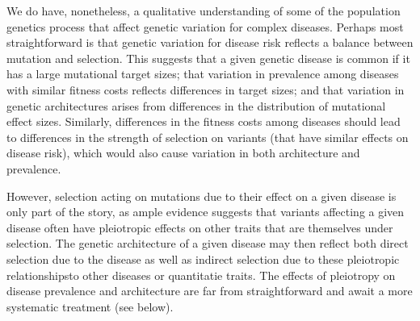 \documentclass[11pt]{article}
\begin{document}
We do have, nonetheless, a qualitative understanding of some of the population genetics process that affect genetic variation for complex diseases. Perhaps most straightforward is that genetic variation for disease risk reflects a balance between mutation and selection.\cite{Johnson:2005do} This suggests that a given genetic disease is common if it has a large mutational target sizes; that variation in prevalence among diseases with similar fitness costs reflects differences in target sizes; and that variation in genetic architectures arises from differences in the distribution of mutational effect sizes. Similarly, differences in the fitness costs among diseases should lead to differences in the strength of selection on variants (that have similar effects on disease risk), which would also cause variation in both architecture and prevalence. 

However, selection acting on mutations due to their effect on a given disease is only part of the story, as ample evidence suggests that variants affecting a given disease often have pleiotropic effects on other traits that are themselves under selection\cite{Pickrell:2016ko, Visscher:2016fp}. The genetic architecture of a given disease may then reflect both direct selection due to the disease as well as indirect selection due to these pleiotropic relationshipsto other diseases or quantitatie traits\cite{Fraser:2013jj,Berg:2014bs, Corona:2013cl, Chen:2012jv, Ayub:2014hk,Polimanti:2017bv}. The effects of pleiotropy on disease prevalence and architecture are far from straightforward and await a more systematic treatment (see below).

\end{document}
